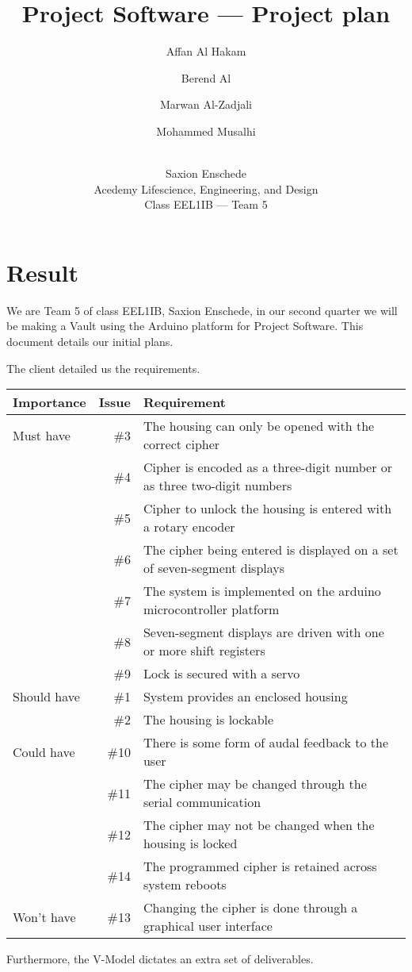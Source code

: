 \documentclass[twoside,a4paper,11pt,titlepage]{report}
\author{ Affan Al Hakam\and Berend Al \and Marwan Al-Zadjali \and Mohammed Musalhi \and\\ Saxion Enschede \\ Acedemy Lifescience, Engineering, and Design \\ Class EEL1IB --- Team 5}
\title{Project Software --- Project plan}
\begin{document}
\maketitle
\tableofcontents
\chapter{Result}
We are Team 5 of class EEL1IB, Saxion Enschede, in our second quarter we will be making a Vault using the Arduino platform for Project Software. This document details our initial plans.

The client detailed us the requirements. 

\begin{tabular}[hbp]{lrl}
\hline Importance & Issue & Requirement \\ \hline
\hline Must have
& \#3 & The housing can only be opened with the correct cipher \\
& \#4 & Cipher is encoded as a three-digit number or as three two-digit numbers \\
& \#5 & Cipher to unlock the housing is entered with a rotary encoder \\
& \#6 & The cipher being entered is displayed on a set of seven-segment displays \\
& \#7 & The system is implemented on the arduino microcontroller platform \\
& \#8 & Seven-segment displays are driven with one or more shift registers \\
& \#9 & Lock is secured with a servo \\
\hline Should have
& \#1 & System provides an enclosed housing \\
& \#2 & The housing is lockable \\
\hline Could have
& \#10 & There is some form of audal feedback to the user \\
& \#11 & The cipher may be changed through the serial communication \\
& \#12 & The cipher may not be changed when the housing is locked \\
& \#14 & The programmed cipher is retained across system reboots \\
\hline Won't have
& \#13 & Changing the cipher is done through a graphical user interface \\
\hline
\end{tabular}

Furthermore, the V-Model dictates an extra set of deliverables.
\end{document}
